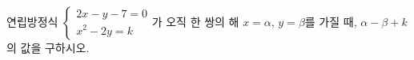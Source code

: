 연립방정식 $\begin{cases} 2x-y-7=0 \\ x^2-2y=k \end{cases}$가 오직 한 쌍의 해 $x=\alpha$, $y=\beta$를 가질 때, $\alpha-\beta+k$의 값을 구하시오. 
